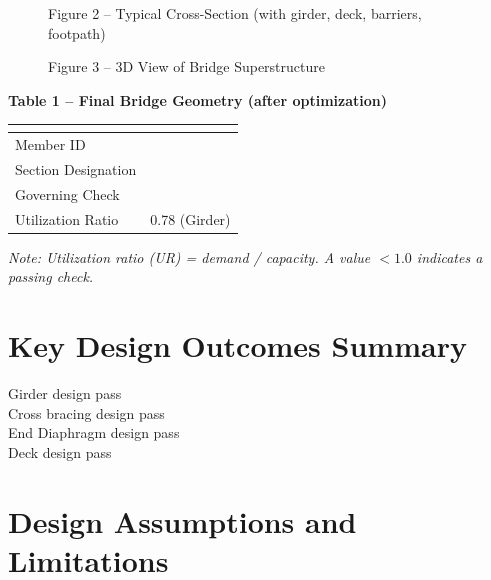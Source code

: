 \documentclass[12pt,a4paper]{report}
\numberwithin{table}{chapter}
\numberwithin{figure}{chapter}
\begin{document}
\begin{figure}[H]
\centering
{}
\caption*{Figure 2 -- Typical Cross-Section (with girder, deck, barriers, footpath)}
\end{figure}

\begin{figure}[H]
\centering
{}
\caption*{Figure 3 -- 3D View of Bridge Superstructure}
\end{figure}

\noindent\textbf{Table 1 -- Final Bridge Geometry (after optimization)}

\vspace{0.4em}
\noindent
\begin{tabular}{|C{2.8cm}|C{12.2cm}|}
\hline
  \textbf{} &
  \textbf{} \\
\hline
Member ID &  \\
\hline
Section Designation &  \\
\hline
Governing Check &  \\
\hline
Utilization Ratio & 0.78 (Girder) \\
\hline
\end{tabular}

\vspace{0.4em}
\noindent\textit{Note: Utilization ratio (UR) = demand / capacity. A value $< 1.0$ indicates a passing check.}

\vspace{1em}

\section*{Key Design Outcomes Summary}
\label{sec:key-outcomes}

\noindent Girder design pass \\
Cross bracing design pass \\
End Diaphragm design pass \\
Deck design pass

\section*{Design Assumptions and Limitations}
\label{sec:assumptions}
\end{document}
